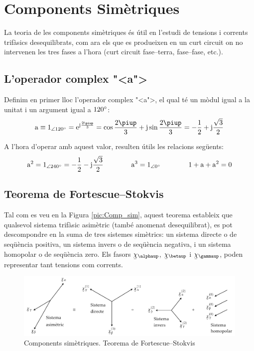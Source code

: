 \chapter{Components Sim\`{e}triques} 

La teoria de les components sim\`{e}triques \'{e}s \'{u}til en l'estudi de
tensions i corrents trif\`{a}sics
 desequilibrats, com ara els que es produeixen en un curt circuit on no intervenen les tres
 fases a l'hora (curt circuit fase--terra, fase--fase, etc.).

\section{L'operador complex {"<}a{">}}

Definim en primer lloc l'operador complex {"<}a{">}, el qual t\'{e} un m\`{o}dul
igual a la unitat i un argument igual a $120^\circ$: 
\begin{equation}
   \au \equiv 1_{\angle 120\degree} = \eu^{\ju\frac{2\piup}{3}} =
   \cos \frac{2\piup}{3} + \ju \sin \frac{2\piup}{3} = - \frac{1}{2} + \ju \frac{\sqrt{3}}{2}
\end{equation}

A l'hora d'operar amb aquest valor, resulten \'{u}tils les relacions
seg\"{u}ents:
\begin{equation}
   \mathrm{a}^2 = 1_{\angle 240^\circ}= - \frac{1}{2} - \mathrm{j} \frac{\sqrt{3}}{2}\qquad\qquad
   \mathrm{a}^3 = 1_{\angle 0^\circ} \qquad\qquad
   1+ \mathrm{a} + \mathrm{a}^2 = 0
\end{equation}

\section{\texorpdfstring{Teorema de Fortescue--Stokvis}{Teorema de Fortescue-Stokvis}}

Tal com es veu en la Figura \vref{pic:Comp_sim}, aquest teorema
estableix que qualsevol sistema trif\`{a}sic asim\`{e}tric (tamb\'{e} anomenat
desequilibrat),  es pot descompondre  en la suma de tres sistemes
sim\`{e}trics: un sistema directe o de seq\"{u}\`{e}ncia positiva, un sistema
invers o de seq\"{u}\`{e}ncia negativa, i un sistema homopolar o de
seq\"{u}\`{e}ncia zero. Els fasors $\cmplx{\chi}_\alphaup$,
$\cmplx{\chi}_\betaup$ i $\cmplx{\chi}_\gammaup$, poden representar tant
tensions com corrents.
\begin{figure}[h]
\centering
    \includegraphics{Imatges/Cap-CompSim-CompSim.pdf}
\caption{Components sim\`{e}triques. Teorema de Fortescue--Stokvis}
\label{pic:Comp_sim}
\end{figure}

